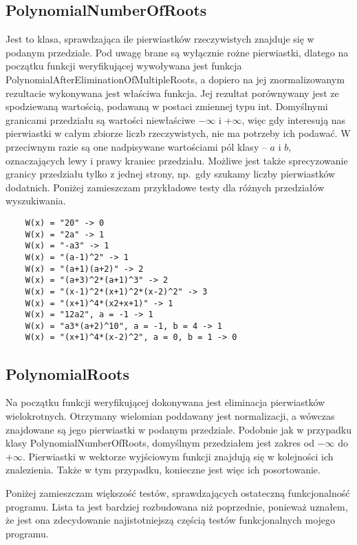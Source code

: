 \documentclass[oneside,a4paper]{book}
\begin{document}
	\subsection{PolynomialNumberOfRoots}
	
	Jest to klasa, sprawdzająca ile pierwiastków rzeczywistych znajduje się w podanym przedziale. Pod uwagę brane są wyłącznie rożne pierwiastki, dlatego na początku funkcji weryfikującej wywoływana jest funkcja PolynomialAfterEliminationOfMultipleRoots, a dopiero na jej znormalizowanym rezultacie wykonywana jest właściwa funkcja. Jej rezultat porównywany jest ze spodziewaną wartością, podawaną w postaci zmiennej typu int. Domyślnymi granicami przedziału są wartości niewłaściwe $-\infty$ i $+\infty$, więc gdy interesują nas pierwiastki w całym zbiorze liczb rzeczywistych, nie ma potrzeby ich podawać. W przeciwnym razie są one nadpisywane wartościami pól klasy – $a$ i $b$, oznaczających lewy i prawy kraniec przedziału. Możliwe jest także sprecyzowanie granicy przedziału tylko z jednej strony, np.\ gdy szukamy liczby pierwiastków dodatnich. Poniżej zamieszczam przykładowe testy dla różnych przedziałów wyszukiwania.
	
	\begin{lstlisting}
	W(x) = "20" -> 0
	W(x) = "2a" -> 1
	W(x) = "-a3" -> 1
	W(x) = "(a-1)^2" -> 1
	W(x) = "(a+1)(a+2)" -> 2
	W(x) = "(a+3)^2*(a+1)^3" -> 2
	W(x) = "(x-1)^2*(x+1)^2*(x-2)^2" -> 3
	W(x) = "(x+1)^4*(x2+x+1)" -> 1
	W(x) = "12a2", a = -1 -> 1
	W(x) = "a3*(a+2)^10", a = -1, b = 4 -> 1
	W(x) = "(x+1)^4*(x-2)^2", a = 0, b = 1 -> 0
	\end{lstlisting}
	
	\subsection{PolynomialRoots}
	
	Na początku funkcji weryfikującej dokonywana jest eliminacja pierwiastków wielokrotnych. Otrzymany wielomian poddawany jest normalizacji, a wówczas znajdowane są jego pierwiastki w podanym przedziale. Podobnie jak w przypadku klasy PolynomialNumberOfRoots, domyślnym przedziałem jest zakres od $-\infty$ do $+\infty$. Pierwiastki w wektorze wyjściowym funkcji znajdują się w kolejności ich znalezienia. Także w tym przypadku, konieczne jest więc ich posortowanie.
	
	Poniżej zamieszczam większość testów, sprawdzających ostateczną funkcjonalność programu. Lista ta jest bardziej rozbudowana niż poprzednie, ponieważ uznałem, że jest ona zdecydowanie najistotniejszą częścią testów funkcjonalnych mojego programu.
	
\end{document}
